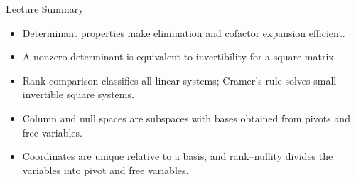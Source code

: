 \documentclass[aspectratio=169]{beamer}
\begin{document}
\begin{frame}{Lecture Summary}
\begin{itemize}
  \item Determinant properties make elimination and cofactor expansion efficient.
  \item A nonzero determinant is equivalent to invertibility for a square matrix.
  \item Rank comparison classifies all linear systems; Cramer's rule solves small invertible square systems.
  \item Column and null spaces are subspaces with bases obtained from pivots and free variables.
  \item Coordinates are unique relative to a basis, and rank--nullity divides the variables into pivot and free variables.
\end{itemize}
\end{frame}
\end{document}
